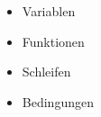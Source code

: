 \begin{frame}
    \begin{itemize}
        \item Variablen
        \item Funktionen
        \item Schleifen
        \item Bedingungen
    \end{itemize}
\end{frame}